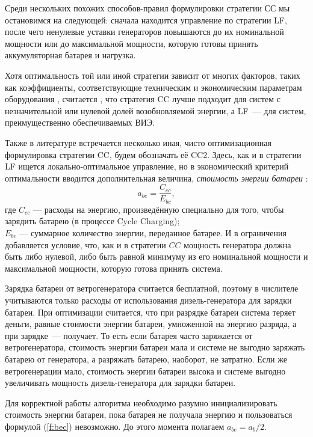 Среди нескольких похожих способов-правил формулировки стратегии СС мы остановимся на следующей: сначала находится управление по стратегии LF, после чего ненулевые уставки генераторов повышаются до их номинальной мощности или до максимальной мощности, которую готовы принять аккумуляторная батарея и нагрузка.

Хотя оптимальность той или иной стратегии зависит от многих факторов, таких как коэффициенты, соответствующие техническим и экономическим параметрам оборудования \cite[177]{Barley1996}, считается \cite{homer_control}, что стратегия CC лучше подходит для систем с незначительной или нулевой долей возобновляемой энергии, а LF~--- для систем, преимущественно обеспечиваемых ВИЭ.

Также в литературе \cite[10]{Aziz2019} встречается несколько иная, чисто оптимизационная формулировка стратегии CC,  будем обозначать её CC2. 
Здесь, как и в стратегии LF ищется локально-оптимальное управление, но в экономический критерий оптимальности вводится дополнительная величина, \textit{стоимость энергии батареи} \cite{bec}:
\begin{equation}\label{f:bec}
    a_{be} = \frac{C_{cc}}{E_{bc}},
\end{equation}
где $C_{cc}$ --- расходы на энергию, произведённую специально для того, чтобы зарядить батарею (в процессе Cycle Charging);\\
$E_{bc}$ --- суммарное количество энергии, переданное батарее.
И в ограничения добавляется условие, что, как и в стратегии $CC$ мощность генератора должна быть либо нулевой, либо быть равной минимуму из его номинальной мощности и максимальной мощности, которую готова принять система.

Зарядка батареи от ветрогенератора считается бесплатной, поэтому в числителе учитываются только расходы от использования дизель-генератора для зарядки батареи.
При оптимизации считается, что при разрядке батареи система теряет деньги, равные стоимости энергии батареи, умноженной на энергию разряда, а при зарядке~--- получает.
То есть если батарея часто заряжается от ветрогенератора, стоимость энергии батареи мала и системе не выгодно заряжать батарею от генератора, а разряжать батарею, наоборот, не затратно.
Если же ветрогенерации мало, стоимость энергии батареи высока и системе выгодно увеличивать мощность дизель-генератора для зарядки батареи.

Для корректной работы алгоритма необходимо разумно инициализировать стоимость энергии батареи, пока батарея не получала энергию и пользоваться формулой (\ref{f:bec}) невозможно.
До этого момента полагаем $a_{be} = a_b / 2$.

